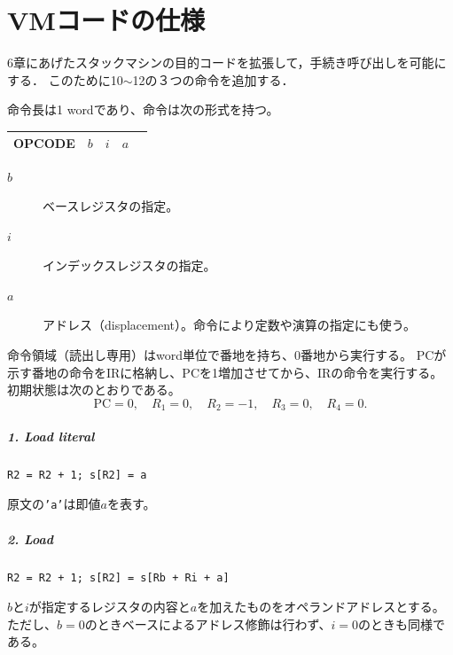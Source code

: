 \documentclass[dvipdfmx,a4j]{jbook}
\begin{document}
\appendix
\chapter{VMコードの仕様}

6章にあげたスタックマシンの目的コードを拡張して，手続き呼び出しを可能にする．
このために10$\sim$12の３つの命令を追加する．

命令長は1 wordであり、命令は次の形式を持つ。
\begin{center}
\begin{tabularx}{.3\textwidth}{|c|Y|Y|Y|Y|}\hline
    OPCODE & $b$ & $i$ & $a$\\\hline
\end{tabularx}
\end{center}
\begin{description}
\item[$b$] ベースレジスタの指定。
\item[$i$] インデックスレジスタの指定。
\item[$a$] アドレス（displacement）。命令により定数や演算の指定にも使う。
\end{description}
命令領域（読出し専用）はword単位で番地を持ち、0番地から実行する。
PCが示す番地の命令をIRに格納し、PCを1増加させてから、IRの命令を実行する。
初期状態は次のとおりである。
\[
\mathrm{PC}=0,\quad R_1=0,\quad R_2=-1,\quad R_3=0,\quad R_4=0.
\]

\paragraph{1. Load literal}
\begin{verbatim}
R2 = R2 + 1; s[R2] = a
\end{verbatim}
\noindent 原文の\texttt{'a'}は即値$a$を表す。

\paragraph{2. Load}
\begin{verbatim}
R2 = R2 + 1; s[R2] = s[Rb + Ri + a]
\end{verbatim}
$b$と$i$が指定するレジスタの内容と$a$を加えたものをオペランドアドレスとする。
ただし、$b=0$のときベースによるアドレス修飾は行わず、$i=0$のときも同様である。
\end{document}
